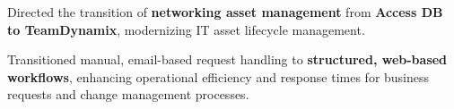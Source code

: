 \documentclass[letterpaper,11pt]{article}
\newcommand{\resumeItem}[1]{
  \item\small{
    {#1 \vspace{-2pt}}
  }
}
\begin{document}
        \resumeItem{Directed the transition of \textbf{networking asset management} from \textbf{Access DB to TeamDynamix}, modernizing IT asset lifecycle management.}
        
        
        \resumeItem{Transitioned manual, email-based request handling to \textbf{structured, web-based workflows}, enhancing operational efficiency and response times for business requests and change management processes.}
        
        
        
        
\end{document}
